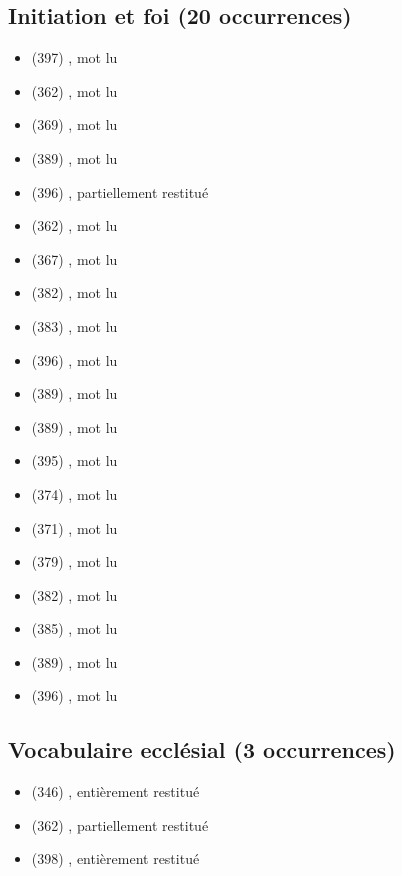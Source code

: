\subsection*{Initiation et foi (20 occurrences)}
\begin{itemize}[leftmargin=1.2em,itemsep=0pt]
\item {} (397) , mot lu
\item {} (362) , mot lu
\item {} (369) , mot lu
\item {} (389) , mot lu
\item {} (396) , partiellement restitué
\item {} (362) , mot lu
\item {} (367) , mot lu
\item {} (382) , mot lu
\item {} (383) , mot lu
\item {} (396) , mot lu
\item {} (389) , mot lu
\item {} (389) , mot lu
\item {} (395) , mot lu
\item {} (374) , mot lu
\item {} (371) , mot lu
\item {} (379) , mot lu
\item {} (382) , mot lu
\item {} (385) , mot lu
\item {} (389) , mot lu
\item {} (396) , mot lu
\end{itemize}
\subsection*{Vocabulaire ecclésial (3 occurrences)}
\begin{itemize}[leftmargin=1.2em,itemsep=0pt]
\item {} (346) , entièrement restitué
\item {} (362) , partiellement restitué
\item {} (398) , entièrement restitué
\end{itemize}
